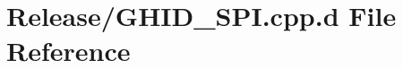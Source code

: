 \hypertarget{_release_2_g_h_i_d___s_p_i_8cpp_8d}{\section{\-Release/\-G\-H\-I\-D\-\_\-\-S\-P\-I.cpp.\-d \-File \-Reference}
\label{_release_2_g_h_i_d___s_p_i_8cpp_8d}
}
